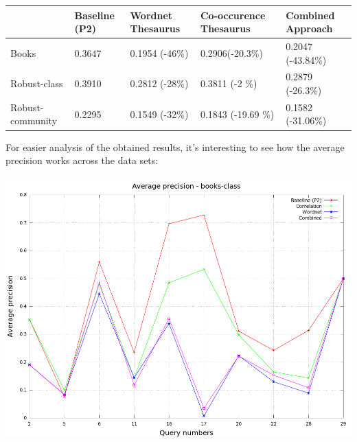 \documentclass[a4paper, 12pt, notitlepage]{report}
\begin{document}
\begin{table}[h]
\begin{tabular}{| p{2.5cm} | p{2.5cm} | p{2.5cm} | p{2.5cm} | p{2.5cm} |}
\hline
\rowcolor[HTML]{BBDAFF} 
                                         & Baseline (P2) & Wordnet Thesaurus & Co-occurence Thesaurus & Combined Approach \\ \hline
\cellcolor[HTML]{BBDAFF}Books            & 0.3647        & 0.1954 (-46\%)    & 0.2906(-20.3\%)        & 0.2047 (-43.84\%) \\ \hline
\cellcolor[HTML]{BBDAFF}Robust-class     & 0.3910        & 0.2812 (-28\%)    & 0.3811 (-2 \%)         & 0.2879 (-26.3\%)  \\ \hline
\cellcolor[HTML]{BBDAFF}Robust-community & 0.2295        & 0.1549 (-32\%)    & 0.1843 (-19.69 \%)     & 0.1582 (-31.06\%) \\ \hline
\end{tabular}
\end{table}

For easier analysis of the obtained results, it's interesting to see how the average precision works across the data sets:

\begin{center}
\includegraphics[scale = 0.4]{books_avg}
\end{center}
\end{document}
